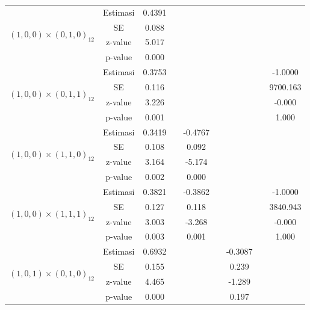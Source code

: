 \begin{enumerate}[label=\alph*.]
\begin{longtable}{|c|c|c|c|c|c|c|c|c|}
            \multirow{4}{*}{$(1,0,0)\times(0,1,0)_{12}$}
            & Estimasi & 0.4391  & {} & {} & {} & {} & {} & {} \\ \cline{2-9}
            & SE       & 0.088  & {} & {} & {} & {} & {} & {} \\ \cline{2-9}
            & z-value  & 5.017   & {} & {} & {} & {} & {} & {}\\ \cline{2-9}
            & p-value  & 0.000 & {} & {} & {} & {} & {} & {} \\ \hline

            \multirow{4}{*}{$(1,0,0)\times(0,1,1)_{12}$}
            & Estimasi & 0.3753  & {} & {} & {} & {} & {} & -1.0000 \\ \cline{2-9}
            & SE       & 0.116  & {} & {} & {} & {} & {} & 9700.163\\ \cline{2-9}
            & z-value  & 3.226   & {} & {} & {} & {} & {} & -0.000\\ \cline{2-9}
            & p-value  & 0.001 & {} & {} & {} & {} & {} & 1.000\\ \hline

            \multirow{4}{*}{$(1,0,0)\times(1,1,0)_{12}$}
            & Estimasi & 0.3419  & {} & -0.4767 & {} & {} & {} & {}\\ \cline{2-9}
            & SE       & 0.108  & {} & 0.092 & {} & {} & {} & {}\\ \cline{2-9}
            & z-value  & 3.164   & {} & -5.174 & {} & {} & {}& {}\\ \cline{2-9}
            & p-value  & 0.002 & {} & 0.000 & {} & {} & {} & {}\\ \hline

            \multirow{4}{*}{$(1,0,0)\times(1,1,1)_{12}$}
            & Estimasi & 0.3821  & {} & -0.3862 & {} & {} & {} & -1.0000 \\ \cline{2-9}
            & SE       & 0.127    & {} & 0.118 & {} & {} & {} & 3840.943\\ \cline{2-9}
            & z-value  & 3.003   & {} & -3.268 & {} & {} & {} & -0.000\\ \cline{2-9}
            & p-value  & 0.003    & {} &  0.001 & {} & {} & {} & 1.000\\ \hline

            \multirow{4}{*}{$(1,0,1)\times(0,1,0)_{12}$}
            & Estimasi & 0.6932  & {} & {} & {} & -0.3087 & {} & {}\\ \cline{2-9}
            & SE       & 0.155 & {} & {} & {} & 0.239 & {} & {}\\ \cline{2-9}
            & z-value  & 4.465   & {} & {} & {} & -1.289 & {}& {}\\ \cline{2-9}
            & p-value  & 0.000 & {} & {} & {} & 0.197 & {} & {}\\ \hline


\end{longtable}
\end{enumerate}
